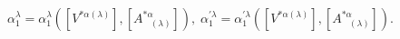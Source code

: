 \begin{equation}
\alpha _{1}^{\lambda }=\alpha _{1}^{\lambda }\left( \left[ V^{*\alpha
(\lambda )}\right] ,\left[ A_{\;\;\;(\lambda )}^{*\alpha }\right] \right)
,\;\alpha _{1}^{\prime \lambda }=\alpha _{1}^{\prime \lambda }\left( \left[
V^{*\alpha (\lambda )}\right] ,\left[ A_{\;\;\;(\lambda )}^{*\alpha }\right]
\right) .  \label{bf70}
\end{equation}

